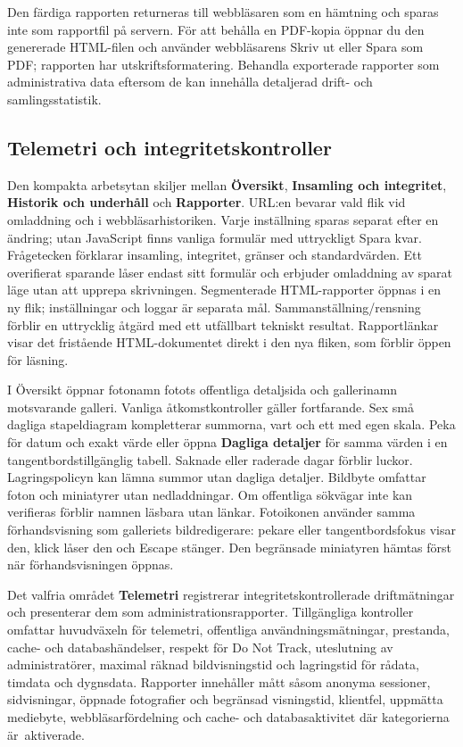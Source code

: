 \documentclass[11pt,a4paper]{article}
\newcommand{\ui}[1]{\textbf{#1}}
\begin{document}
Den färdiga rapporten returneras till webbläsaren som en hämtning och sparas
inte som rapportfil på servern. För att behålla en PDF-kopia öppnar du den
genererade HTML-filen och använder webbläsarens Skriv ut eller Spara som PDF;
rapporten har utskriftsformatering. Behandla exporterade rapporter som
administrativa data eftersom de kan innehålla detaljerad drift- och
samlingsstatistik.

\subsection{Telemetri och integritetskontroller}

Den kompakta arbetsytan skiljer mellan \ui{Översikt},
\ui{Insamling och integritet}, \ui{Historik och underhåll} och \ui{Rapporter}.
URL:en bevarar vald flik vid omladdning och i webbläsarhistoriken.
Varje inställning sparas separat efter en ändring; utan JavaScript finns
vanliga formulär med uttryckligt Spara kvar. Frågetecken förklarar insamling,
integritet, gränser och standardvärden. Ett overifierat sparande låser endast
sitt formulär och erbjuder omladdning av sparat läge utan att upprepa
skrivningen. Segmenterade HTML-rapporter öppnas i en ny flik; inställningar och
loggar är separata mål. Sammanställning/rensning förblir en uttrycklig åtgärd
med ett utfällbart tekniskt resultat.
Rapportlänkar visar det fristående HTML-dokumentet direkt i den nya fliken,
som förblir öppen för läsning.

I Översikt öppnar fotonamn fotots offentliga detaljsida och gallerinamn
motsvarande galleri. Vanliga åtkomstkontroller gäller fortfarande. Sex små
dagliga stapeldiagram kompletterar summorna, vart och ett med egen skala.
Peka för datum och exakt värde eller öppna \ui{Dagliga detaljer} för samma
värden i en tangentbordstillgänglig tabell. Saknade eller raderade dagar
förblir luckor. Lagringspolicyn kan lämna summor utan dagliga detaljer.
Bildbyte omfattar foton och miniatyrer utan nedladdningar. Om offentliga
sökvägar
inte kan verifieras förblir namnen läsbara utan länkar.
Fotoikonen använder samma förhandsvisning som galleriets bildredigerare:
pekare eller tangentbordsfokus visar den, klick låser den och Escape stänger.
Den begränsade miniatyren hämtas först när förhandsvisningen öppnas.

Det valfria området \ui{Telemetri} registrerar integritetskontrollerade
driftmätningar och presenterar dem som administrationsrapporter. Tillgängliga
kontroller omfattar huvudväxeln för telemetri, offentliga användningsmätningar,
prestanda, cache- och databashändelser, respekt för Do Not Track, uteslutning av
administratörer, maximal räknad bildvisningstid och lagringstid för rådata,
timdata och dygnsdata. Rapporter innehåller mått såsom anonyma sessioner,
sidvisningar, öppnade fotografier och begränsad visningstid, klientfel, uppmätta
mediebyte, webbläsarfördelning och cache- och databasaktivitet där kategorierna
är~aktiverade.
\end{document}
